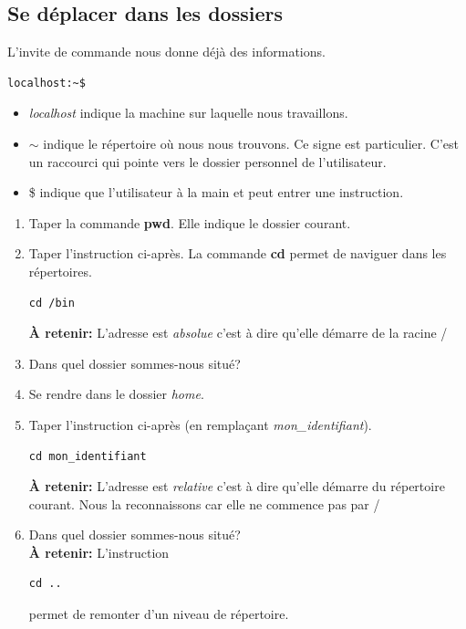 \documentclass[a4paper,11pt]{article}
\begin{document}
\begin{Form}
\subsection{Se déplacer dans les dossiers}
L'invite de commande nous donne déjà des informations.
\begin{lstlisting}
localhost:~$
\end{lstlisting}
\begin{itemize}
\item \emph{localhost} indique la machine sur laquelle nous travaillons.
\item $\sim$ indique le répertoire où nous nous trouvons. Ce signe est particulier. C'est un raccourci qui pointe vers le dossier personnel de l'utilisateur.
\item \$ indique que l'utilisateur à la main et peut entrer une instruction.
\end{itemize}
\begin{activite}
\begin{enumerate}
\item Taper la commande \textbf{pwd}. Elle indique le dossier courant.
\item Taper l'instruction ci-après. La commande \textbf{cd} permet de naviguer dans les répertoires.
\begin{lstlisting}
cd /bin
\end{lstlisting}
\textbf{À retenir:} L'adresse est \emph{absolue} c'est à dire qu'elle démarre de la racine /
\item Dans quel dossier sommes-nous situé?
\item Se rendre dans le dossier \emph{home}.
\item Taper l'instruction ci-après (en remplaçant \emph{mon\_identifiant}).
\begin{lstlisting}
cd mon_identifiant
\end{lstlisting}
\textbf{À retenir:} L'adresse est \emph{relative} c'est à dire qu'elle démarre du répertoire courant. Nous la reconnaissons car elle ne commence pas par /
\item Dans quel dossier sommes-nous situé?\\
\textbf{À retenir:} L'instruction
\begin{lstlisting}
cd ..
\end{lstlisting}
permet de remonter d'un niveau de répertoire.
\end{enumerate}
\end{activite}

\end{Form}
\end{document}
